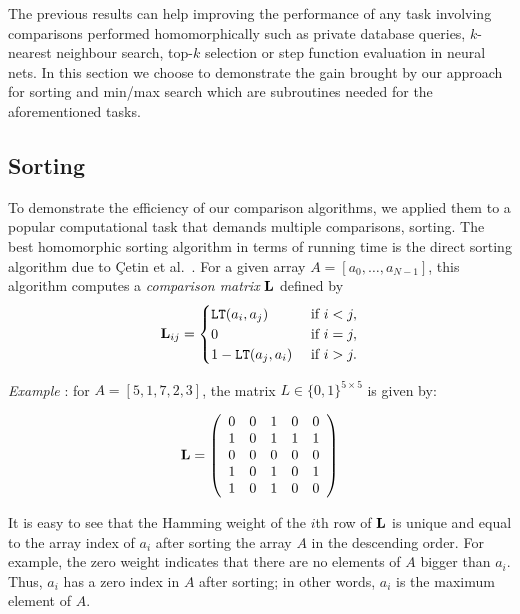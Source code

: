 The previous results can help improving the performance of any task involving comparisons performed homomorphically such as private database queries, $k$-nearest neighbour search, top-$k$ selection or step function evaluation in neural nets. In this section we choose to demonstrate the gain brought by our approach for sorting and min/max search which are subroutines needed for the aforementioned tasks.

\subsection{Sorting}
\label{subsec:sorting}

    To demonstrate the efficiency of our comparison algorithms, we applied them to a popular computational task that demands multiple comparisons, sorting.
	The best homomorphic sorting algorithm in terms of running time is the direct sorting algorithm due to {\c C}etin et al.~\cite{CDSS15}.
	For a given array $A = [a_0,\dots,a_{N-1}]$, this algorithm computes a \emph{comparison matrix} $\mathbf{L}$ defined by
	\begin{align*}
		\mathbf{L}_{ij} =
		\begin{cases}
			\mathtt{LT}(a_i, a_j) & \text{ if } i < j, \\
			0 & \text{ if } i = j, \\
			1 - \mathtt{LT}(a_j, a_i) & \text{ if } i > j.
		\end{cases}
	\end{align*}

        \emph{Example} : for $A = [5,1,7,2,3]$, the matrix $L\in\{0,1\}^{5\times 5}$ is given by:

        $$ \mathbf{L} = \left(
          \begin{array}{ccccc}
            0 & 0 & 1 & 0 & 0 \\
            1 & 0 & 1 & 1 & 1 \\
            0 & 0 & 0 & 0 & 0 \\
            1 & 0 & 1 & 0 & 1 \\
            1 & 0 & 1 & 0 & 0
          \end{array}
\right)$$
        
        It is easy to see that the Hamming weight of the $i$th row of $\mathbf{L}$ is unique and equal to the array index of $a_i$ after sorting the array $A$ in the descending order.
	For example, the zero weight indicates that there are no elements of $A$ bigger than $a_i$. 
	Thus, $a_i$ has a zero index in $A$ after sorting; in other words, $a_i$ is the maximum element of $A$.

